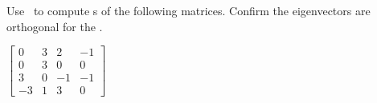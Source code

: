 \begin{example}
\begin{solution}
\begin{itemize}
\end{itemize}
\end{solution}
\end{example}



\begin{example} \label{eg:4x4orthevec}
Use \script\ to compute s of the following matrices.
Confirm the eigenvectors are orthogonal for the .
\begin{Parts}
\item \(\begin{bmatrix} 0 & 3 & 2 & -1
\\ 0 & 3 & 0 & 0
\\ 3 & 0 & -1 & -1
\\ -3 & 1 & 3 & 0 \end{bmatrix}\)
  

\end{Parts}
\end{example}
